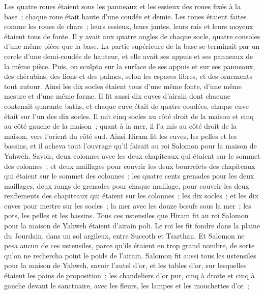 \begin{multicols}{2}
Les quatre roues étaient sous les panneaux et les essieux des roues fixés à la base~; chaque roue était haute d'une coudée et demie.
Les roues étaient faites comme les roues de chars~; leurs essieux, leurs jantes, leurs rais et leurs moyeux étaient tous de fonte.
Il y avait aux quatre angles de chaque socle, quatre consoles d'une même pièce que la base.
La partie supérieure de la base se terminait par un cercle d'une demi-coudée de hauteur, et elle avait ses appuis et ses panneaux de la même pièce.
Puis, on sculpta sur la surface de ses appuis et sur ses panneaux, des chérubins, des lions et des palmes, selon les espaces libres, et des ornements tout autour.
Ainsi les dix socles étaient tous d'une même fonte, d'une même mesure et d'une même forme.
Il fit aussi dix cuves d'airain dont chacune contenait quarante baths, et chaque cuve était de quatre coudées, chaque cuve était sur l'un des dix socles.
Il mit cinq socles au côté droit de la maison et cinq au côté gauche de la maison~; quant à la mer, il l'a mis au côté droit de la maison, vers l'orient du côté sud.
Ainsi Hiram fit les cuves, les pelles et les bassins, et il acheva tout l'ouvrage qu'il faisait au roi Salomon pour la maison de Yahweh.
Savoir, deux colonnes avec les deux chapiteaux qui étaient sur le sommet des colonnes~; et deux maillages pour couvrir les deux bourrelets des chapiteaux qui étaient sur le sommet des colonnes~;
les quatre cents grenades pour les deux maillages, deux rangs de grenades pour chaque maillage, pour couvrir les deux renflements des chapiteaux qui étaient sur les colonnes~;
les dix socles~; et les dix cuves pour mettre sur les socles~;
la mer avec les douze bœufs sous la mer~;
les pots, les pelles et les bassins. Tous ces ustensiles que Hiram fit au roi Salomon pour la maison de Yahweh étaient d'airain poli.
Le roi les fit fondre dans la plaine du Jourdain, dans un sol argileux, entre Succoth et Tsarthan.
Et Salomon ne pesa aucun de ces ustensiles, parce qu'ils étaient en trop grand nombre, de sorte qu'on ne rechercha point le poids de l'airain.
Salomon fit aussi tous les ustensiles pour la maison de Yahweh, savoir l'autel d'or, et les tables d'or, sur lesquelles étaient les pains de proposition~;
les chandeliers d'or pur, cinq à droite et cinq à gauche devant le sanctuaire, avec les fleurs, les lampes et les mouchettes d'or~;

\end{multicols}
